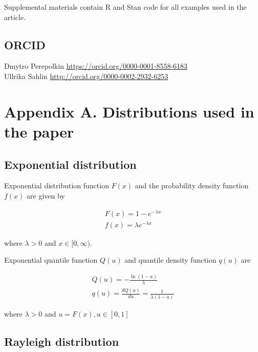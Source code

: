 \documentclass[
  12pt,
]{article}
\begin{document}
Supplemental materials contain R and Stan code for all examples used in the article.

\hypertarget{orcid}{%
\subsection*{ORCID}\label{orcid}}

Dmytro Perepolkin \url{https://orcid.org/0000-0001-8558-6183}\\
Ullrika Sahlin \url{http://orcid.org/0000-0002-2932-6253}

\hypertarget{appendix-a.-distributions-used-in-the-paper}{%
\section*{Appendix A. Distributions used in the paper}\label{appendix-a.-distributions-used-in-the-paper}}

\hypertarget{exponential-distribution}{%
\subsection*{Exponential distribution}\label{exponential-distribution}}

Exponential distribution function \(F(x)\) and the probability density function \(f(x)\) are given by

\[
\begin{gathered}
F(x)=1-e^{-\lambda x} \\ 
f(x)=\lambda e^{-\lambda x}
\end{gathered}
\]

where \(\lambda>0\) and \(x\in[0,\infty)\).

Exponential quantile function \(Q(u)\) and quantile density function \(q(u)\) are

\[
\begin{gathered}
Q(u)=-\frac{\ln(1-u)}{\lambda}\\ 
q(u)=\frac{dQ(u)}{du}=\frac{1}{\lambda(1-u)}
\end{gathered}
\]

where \(\lambda>0\) and \(u=F(x), u \in [0,1]\)

\hypertarget{rayleigh-distribution}{%
\subsection*{Rayleigh distribution}\label{rayleigh-distribution}}
\end{document}
